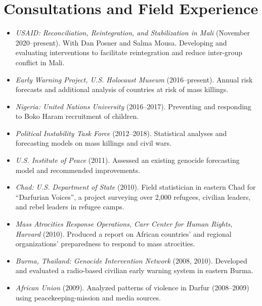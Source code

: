 \documentclass[11pt]{article}
\begin{document}
\section{Consultations and Field Experience}
\begin{itemize}
\item \emph{USAID: Reconciliation, Reintegration, and Stabilization in Mali} (November 2020--present). With Dan Posner and Salma Mousa. Developing and evaluating interventions to facilitate reintegration and reduce inter-group conflict in Mali.
\item \emph{Early Warning Project, U.S. Holocaust Museum} (2016--present). Annual risk forecasts and additional analysis of countries at risk of mass killings.
\item \emph{Nigeria: United Nations University} (2016--2017). Preventing and responding to Boko Haram recruitment of children.
\item \emph{Political Instability Task Force} (2012--2018). Statistical analyses and forecasting models on mass killings and civil wars.
\item \emph{U.S. Institute of Peace} (2011). Assessed an existing genocide forecasting model and recommended improvements.
\item \emph{Chad: U.S. Department of State} (2010). Field statistician in eastern Chad for ``Darfurian Voices'', a project surveying over 2,000 refugees, civilian leaders, and rebel leaders in refugee camps.
\item \emph{Mass Atrocities Response Operations, Carr Center for Human Rights, Harvard} (2010). Produced a report on African countries' and regional organizations' preparedness to respond to mass atrocities.
\item \emph{Burma, Thailand: Genocide Intervention Network} (2008, 2010). Developed and evaluated a radio-based civilian early warning system in eastern Burma.
\item \emph{African Union} (2009). Analyzed patterns of violence in Darfur (2008--2009) using peacekeeping-mission and media sources.
\end{itemize}

\iffalse
\end{document}
